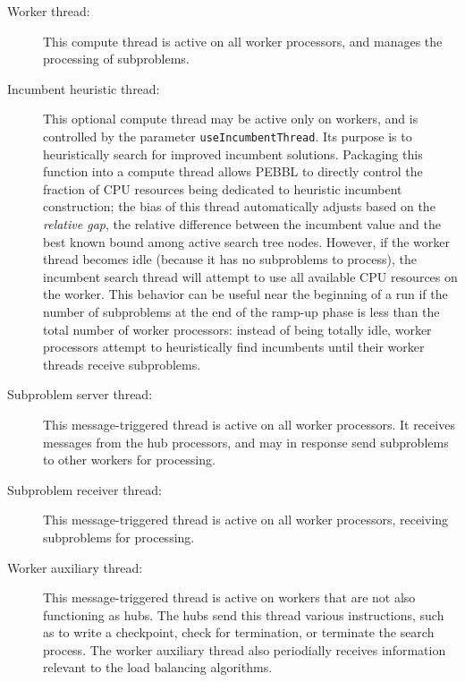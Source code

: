 \begin{description}
\item[Worker thread:] This compute thread is active on all worker
  processors, and manages the processing of subproblems.

\item[Incumbent heuristic thread:] This optional compute thread may be
  active only on workers, and is controlled by the parameter
  \texttt{useIncumbentThread}.  Its purpose is to heuristically search
  for improved incumbent solutions.  Packaging this function into a
  compute thread allows PEBBL to directly control the fraction of CPU
  resources being dedicated to heuristic incumbent construction; the
  bias of this thread automatically adjusts based on the \emph{relative
  gap}, the relative difference between the incumbent value
  and the best known bound among active search tree nodes.  However,
  if the worker thread becomes idle (because it has no subproblems to
  process), the incumbent search thread will attempt to use all
  available CPU resources on the worker.  This behavior can be useful
  near the beginning of a run if the number of subproblems at the end of
  the ramp-up phase is less than the total number of worker
  processors: instead of being totally idle, worker
  processors attempt to heuristically find incumbents until their
  worker threads receive subproblems.

\item[Subproblem server thread:] This message-triggered thread is
  active on all worker processors.  It receives messages from the hub
  processors, and may in response send subproblems to other workers
  for processing.

\item[Subproblem receiver thread:]  This message-triggered thread is
  active on all worker processors, receiving subproblems for processing.

\item[Worker auxiliary thread:] This message-triggered thread is
  active on workers that are not also functioning as hubs.  The hubs
  send this thread various instructions, such as to write a
  checkpoint, check for termination, or terminate the search process.
  The worker auxiliary thread also periodially receives information
  relevant to the load balancing algorithms.

\end{description}


